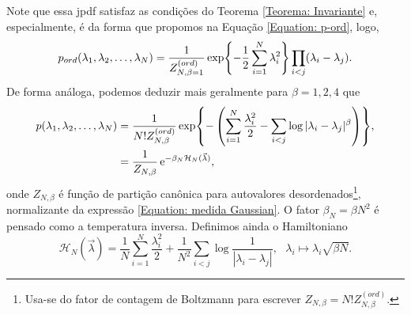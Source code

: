 Note que essa jpdf satisfaz as condições do Teorema \ref{Teorema: Invariante} e, especialmente, é da forma que propomos na Equação \ref{Equation: p-ord}, logo, $$ p_{ord}(\lambda_1, \lambda_2, \dots, \lambda_N) = \frac{1}{Z_{N, \beta = 1}^{(ord)}} \exp{-\frac{1}{2} \sum_{i = 1}^{N} \lambda_i^2} \prod_{i < j} (\lambda_i - \lambda_j).$$ 
De forma análoga, podemos deduzir mais geralmente para $\beta = 1,2,4$ que
\begin{equation}
	\begin{split}
		p(\lambda_1, \lambda_2, \dots, \lambda_N) 
		&= \frac{1}{ N! Z_{N, \beta}^{(ord)}} \exp{- \left(\sum_{i = 1}^{N} \frac{\lambda_i^2}{2} - \sum_{i < j} \log{|\lambda_i - \lambda_j|^{\beta}} \right)}, \\
		&= \frac{1}{Z_{N, \beta}} \operatorname{\textrm e}^{-\beta_N \mathcal{H}_N(\vec{\lambda})},
	\end{split}
\label{Equation: medida Gaussian}
\end{equation}
onde $Z_{N, \beta}$ é função de partição canônica para autovalores desordenados\footnote{Usa-se do fator de contagem de Boltzmann \cite[Capítulo~3]{landau2013statistical} para escrever $ Z_{N, \beta} = N! Z_{N, \beta}^{(ord)}$.}, normalizante da expressão \ref{Equation: medida Gaussian}. O fator $\beta_N = \beta N^2$ é pensado como a temperatura inversa. Definimos ainda o Hamiltoniano $$\mathcal{H}_N(\vec{\lambda}) = \frac{1}{N}\sum_{i = 1}^{N} \frac{\lambda_i^2}{2} + \frac{1}{N^2} \sum_{i < j} \log{\frac{1}{|\lambda_i - \lambda_j|}}, \ \ \  \lambda_i \mapsto \lambda_i \sqrt{\beta N}.$$

